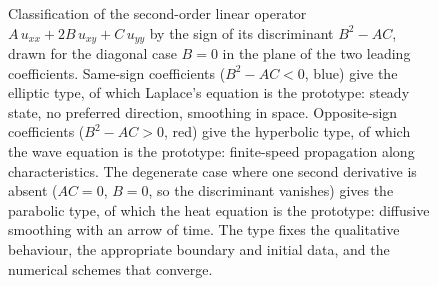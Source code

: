 \begin{figure}[htbp]
\caption[Classification of second-order linear PDEs]{Classification
of the second-order linear operator $A\,u_{xx} + 2B\,u_{xy} +
C\,u_{yy}$ by the sign of its discriminant $B^{2} - AC$, drawn for
the diagonal case $B = 0$ in the plane of the two leading
coefficients. Same-sign coefficients ($B^{2} - AC < 0$, blue)
give the elliptic type, of which Laplace's equation is the
prototype: steady state, no preferred direction, smoothing in
space. Opposite-sign coefficients ($B^{2} - AC > 0$, red) give the
hyperbolic type, of which the wave equation is the prototype:
finite-speed propagation along characteristics. The degenerate case
where one second derivative is absent ($AC = 0$, $B = 0$, so the
discriminant vanishes) gives the parabolic type, of which the heat
equation is the prototype: diffusive smoothing with an arrow of
time. The type fixes the qualitative behaviour, the appropriate
boundary and initial data, and the numerical schemes that
converge.}
\label{fig:vol02:ch12:classification}
\end{figure}
